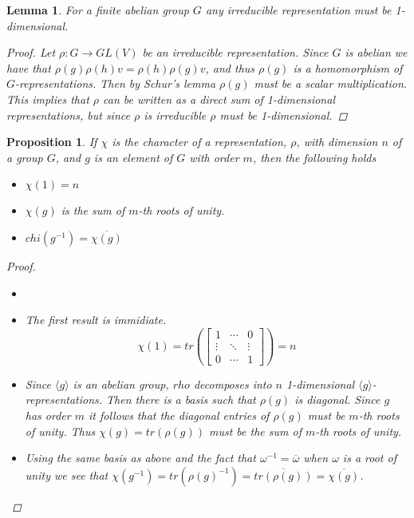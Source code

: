 \documentclass[11pt, a4paper, english]{article}
\newtheorem*{prop}{Proposition}
\newtheorem*{lemma}{Lemma}
\begin{document}
\begin{lemma}
For a finite abelian group $G$ any irreducible representation must be 1-dimensional.
\begin{proof}
Let $\rho: G \to GL(V)$ be an irreducible representation. Since $G$ is abelian we have that $\rho(g)\rho(h)v = \rho(h)\rho(g)v$, and thus $\rho(g)$ is a homomorphism of $G$-representations. Then by Schur's lemma $\rho(g)$ must be a scalar multiplication. This implies that $\rho$ can be written as a direct sum of 1-dimensional representations, but since $\rho$ is irreducible $\rho$ must be 1-dimensional.
\end{proof}
\end{lemma}

\begin{prop}
If $\chi$ is the character of a representation, $\rho$, with dimension $n$ of a group $G$, and $g$ is an element of $G$ with order $m$, then the following holds
\begin{itemize}
 \item[(1)] $\chi(1) = n$
 \item[(2)] $\chi(g)$ is the sum of $m$-th roots of unity.
 \item[(3)] $chi(g^{-1}) = \overline{\chi(g)}$
\end{itemize}
\begin{proof}

\begin{itemize}
\item[]
\item[(1)]
The first result is immidiate.
$$\chi(1) = tr\left(\begin{bmatrix}
1 & \cdots & 0\\
\vdots & \ddots & \vdots\\
0 & \cdots & 1
\end{bmatrix}\right) = n$$
\item[(2)]
Since $\langle g \rangle$ is an abelian group, $rho$ decomposes into $n$ 1-dimensional $\langle g \rangle$-representations. Then there is a basis such that $\rho(g)$ is diagonal. Since $g$ has order $m$ it follows that the diagonal entries of $\rho(g)$ must be $m$-th roots of unity. Thus $\chi(g) = tr(\rho(g))$ must be the sum of $m$-th roots of unity.
\item[(3)]
Using the same basis as above and the fact that $\omega^{-1} = \overline{\omega}$ when $\omega$ is a root of unity we see that $\chi(g^{-1}) = tr(\rho(g)^{-1}) = \overline{tr(\rho(g))} = \overline{\chi(g)}$.
\end{itemize}
\end{proof}
\end{prop}
\end{document}
